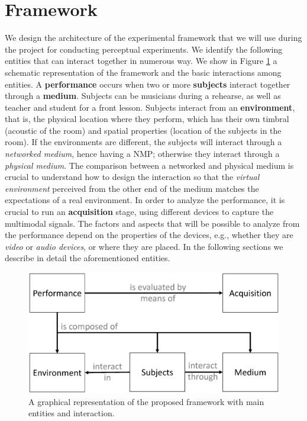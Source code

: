 \section{Framework}\label{sec:framework}
We design the architecture of the experimental framework that we will use during the project for conducting perceptual experiments. We identify the following entities that can interact together in numerous way. We show in Figure \ref{fig:framework} a schematic representation of the framework and the basic interactions among entities. A \textbf{performance} occurs when two or more \textbf{subjects} interact together through a \textbf{medium}. Subjects can be musicians during a rehearse, as well as teacher and student for a front lesson. Subjects interact from an \textbf{environment}, that is, the physical location where they perform, which has their own timbral (acoustic of the room) and spatial properties (location of the subjects in the room). If the environments are different, the subjects will interact through a \textit{networked medium}, hence having a NMP; otherwise they interact through a \textit{physical medium}. The comparison between a networked and physical medium is crucial to understand how to design the interaction so that the \textit{virtual environment} perceived from the other end of the medium matches the expectations of a real environment. In order to analyze the performance, it is crucial to run an \textbf{acquisition} stage, using different devices to capture the multimodal signals. The factors and aspects that will be possible to analyze from the performance depend on the properties of the devices, e.g., whether they are \textit{video} or \textit{audio devices}, or where they are placed. In the following sections we describe in detail the aforementioned entities.



\begin{figure}[t]
	\centering
	\includegraphics[width=\columnwidth]{img/framework.eps}
	\caption{A graphical representation of the proposed framework with main entities and interaction.}
	\label{fig:framework}
\end{figure}

